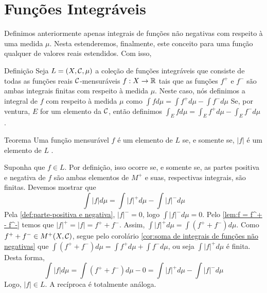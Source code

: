 \section{Funções Integráveis}
Definimos anteriormente apenas integrais de funções não negativas com respeito à uma medida $\mu$.
Nesta estenderemos, finalmente, este conceito para uma função qualquer de valores reais estendidos. Com isso,

\begin{env}{Definição}
	Seja $L = (X, \operatorname{\mathcal{C}}, \mu)$ a coleção de funções integráveis que consiste de todas as funções reais $\operatorname{\mathcal{C}}$-mensuráveis $f:X \to \mathbb{R}$ tais que as funções
	$f^+$ e $f^-$ são ambas integrais finitas com respeito à medida $\mu$.
	Neste caso, nós definimos a integral de $f$ com respeito à medida $\mu$ como
	$
	\int fd\mu
	= \int f^+ d\mu - \int f^- d\mu
	$
	Se, por ventura, $E$ for um elemento da \sigal $\operatorname{\mathcal{C}}$, então definimos
	$
	\int_E fd\mu
	= \int_E f^+ d\mu - \int_E f^- d\mu
	$ \cite{bartle}.
\end{env}

\begin{env}{Teorema}
	\label{teo:f é integrável se, só, se |f| o é}
	Uma função mensurável $f$ é um elemento de $L$ se, e somente se, $|f|$ é um elemento de $L$ \cite{bartle}.
\end{env}
\begin{prova}
	Suponha que $f \in L$.
	Por definição, isso ocorre se, e somente se, as partes positiva e negativa de $f$ são ambas elementos de $M^+$ e suas, respectivas integrais, são finitas.
	Devemos mostrar que 
	$$
		\int |f| d\mu = \int |f|^+ d\mu - \int |f|^-d\mu
	$$
	Pela \ref{def:parte-positiva e negativa}, $|f|^- = 0$, logo 
	$\int |f|^- d\mu = 0$.
	Pelo \ref{lem:f = f^+ - f^-} temos que
	$|f|^+ = |f| = f^+ + f^-$.
	Assim, $\displaystyle \int |f|^+ d\mu = \int (f^+ + f^-)d\mu$.
	Como $f^+ + f^- \in M^+(X, \operatorname{\mathcal{C}})$, segue pelo corolário \ref{cor:soma de integrais de funções não negativas} que 
	$\displaystyle\int (f^+ + f^-)d\mu = \int f^+ d\mu + \int f^- d\mu$, ou seja $\displaystyle\int |f|^+d\mu$ é finita.
	Desta forma, 
	$$
	\int |f| d\mu 
	= \int (f^+ + f^-)d\mu - 0 
	= \int |f|^+ d\mu - \int |f|^- d\mu
	$$
	Logo, $|f| \in L$.
	A recíproca é totalmente análoga.	
\end{prova}

